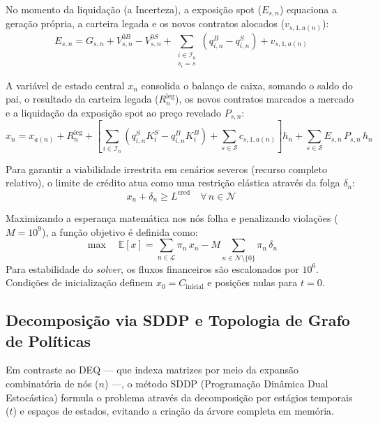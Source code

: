 No momento da liquidação (a Incerteza), a exposição spot ($E_{s,n}$) equaciona a geração própria, a carteira legada e os novos contratos alocados ($v_{s,1,a(n)}$):
\begin{equation}
    E_{s,n} = G_{s,n} + V_{s,n}^{0B} - V_{s,n}^{0S} + \sum_{\substack{i \in \mathcal{I}_n \\ s_i = s}} (q_{i,n}^B - q_{i,n}^S) + v_{s,1,a(n)}
\end{equation}

A variável de estado central $x_n$ consolida o balanço de caixa, somando o saldo do pai, o resultado da carteira legada ($R_n^{\text{leg}}$), os novos contratos marcados a mercado e a liquidação da exposição spot ao preço revelado $P_{s,n}$:
\begin{equation}
    x_n = x_{a(n)} + R_n^{\text{leg}} + \left[ \sum_{i \in \mathcal{I}_n} \left(q_{i,n}^S K_i^S - q_{i,n}^B K_i^B\right) + \sum_{s \in \mathcal{S}} c_{s,1,a(n)} \right] h_n + \sum_{s \in \mathcal{S}} E_{s,n}\, P_{s,n}\, h_n
\end{equation}

Para garantir a viabilidade irrestrita em cenários severos (recurso completo relativo), o limite de crédito atua como uma restrição elástica através da folga $\delta_n$:
\begin{equation}
    x_n + \delta_n \ge L^{\text{cred}} \quad \forall\, n \in \mathcal{N} \label{eq:credito}
\end{equation}

Maximizando a esperança matemática nos nós folha e penalizando violações ($M = 10^9$), a função objetivo é definida como:
\begin{equation}
    \max \quad \mathbb{E}[x] = \sum_{n \in \mathcal{L}} \pi_n\, x_n - M \sum_{n \in \mathcal{N} \setminus \{0\}} \pi_n\, \delta_n
\end{equation}
Para estabilidade do \textit{solver}, os fluxos financeiros são escalonados por $10^6$. Condições de inicialização definem $x_0 = C_{\text{inicial}}$ e posições nulas para $t=0$.

\subsection{Decomposição via SDDP e Topologia de Grafo de Políticas}
\label{sec:sddp_grafo}

Em contraste ao DEQ — que indexa matrizes por meio da expansão combinatória de nós ($n$) —, o método SDDP (Programação Dinâmica Dual Estocástica) formula o problema através da decomposição por estágios temporais ($t$) e espaços de estados, evitando a criação da árvore completa em memória.

